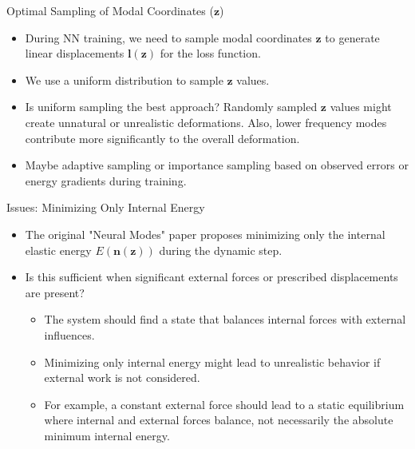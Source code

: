 \documentclass{beamer}
\begin{document}
\begin{frame}{Optimal Sampling of Modal Coordinates (\(\bm{z}\))}
    \begin{itemize}
        \item During NN training, we need to sample modal coordinates \(\bm{z}\) to generate linear displacements \(\bm{l}(\bm{z})\) for the loss function.
        \item We use a uniform distribution to sample \(\bm{z}\) values.

        \item Is uniform sampling the best approach? Randomly sampled \(\bm{z}\) values might create unnatural or unrealistic deformations. Also, lower frequency modes contribute more significantly to the overall deformation.
        \item Maybe adaptive sampling or importance sampling based on observed errors or energy gradients during training.
    \end{itemize}
\end{frame}

\begin{frame}{Issues: Minimizing Only Internal Energy}
    \begin{itemize}
        \item The original "Neural Modes" paper proposes minimizing only the internal elastic energy \(E(\bm{n}(\bm{z}))\) during the dynamic step.
        \item Is this sufficient when significant external forces or prescribed displacements are present?
        \begin{itemize}
            \item The system should find a state that balances internal forces with external influences.
            \item Minimizing only internal energy might lead to unrealistic behavior if external work is not considered.
            \item For example, a constant external force should lead to a static equilibrium where internal and external forces balance, not necessarily the absolute minimum internal energy.
        \end{itemize}
    \end{itemize}
\end{frame}
\end{document}
